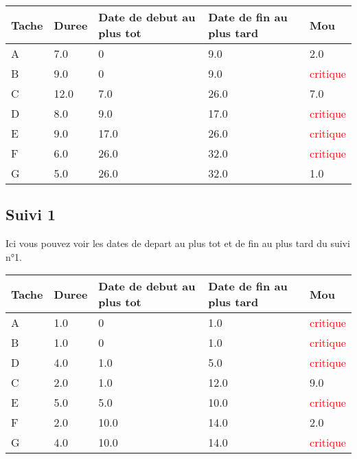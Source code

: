 \documentclass{article}
\begin{document}
\begin{tabular}{|l|l|l|l|l|}
\hline 
Tache & Duree & Date de debut au plus tot & Date de fin au plus tard & Mou\tabularnewline
\hline

A&7.0&0&9.0&2.0\tabularnewline
\hline
B&9.0&0&9.0&\textcolor{red}{critique}\tabularnewline
\hline
C&12.0&7.0&26.0&7.0\tabularnewline
\hline
D&8.0&9.0&17.0&\textcolor{red}{critique}\tabularnewline
\hline
E&9.0&17.0&26.0&\textcolor{red}{critique}\tabularnewline
\hline
F&6.0&26.0&32.0&\textcolor{red}{critique}\tabularnewline
\hline
G&5.0&26.0&32.0&1.0\tabularnewline
\hline

\end{tabular}
\subsection{Suivi 1}
Ici vous pouvez voir les dates de depart au plus tot et de fin au plus tard du suivi n°1.\\
\begin{tabular}{|l|l|l|l|l|}
\hline 
Tache & Duree & Date de debut au plus tot & Date de fin au plus tard & Mou\tabularnewline
\hline

A&1.0&0&1.0&\textcolor{red}{critique}\tabularnewline
\hline
B&1.0&0&1.0&\textcolor{red}{critique}\tabularnewline
\hline
D&4.0&1.0&5.0&\textcolor{red}{critique}\tabularnewline
\hline
C&2.0&1.0&12.0&9.0\tabularnewline
\hline
E&5.0&5.0&10.0&\textcolor{red}{critique}\tabularnewline
\hline
F&2.0&10.0&14.0&2.0\tabularnewline
\hline
G&4.0&10.0&14.0&\textcolor{red}{critique}\tabularnewline
\hline

\end{tabular}
\end{document}
